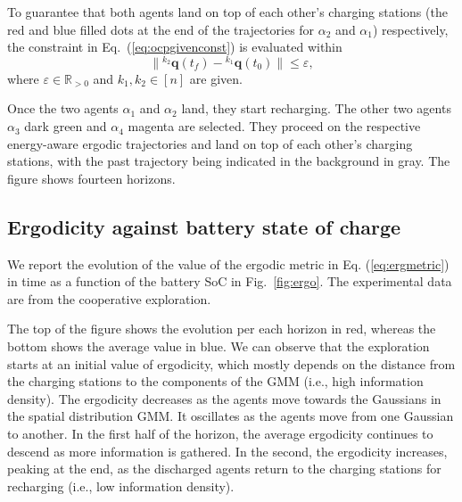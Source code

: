 \documentclass[letterpaper,10pt,conference,twoside]{IEEEtran}
\theoremstyle{definition}
\begin{document}
To guarantee that both agents land %
on top of each other's charging stations (the red and blue filled dots at the end of the trajectories for $\alpha_2$ and $\alpha_1$) respectively, %
the constraint in Eq.~(\ref{eq:ocpgivenconst}) is evaluated within
\begin{equation}\label{eq:resaddconst}
  \lVert{}^{k_2}\mathbf{q}(t_f)-{}^{k_1}\mathbf{q}(t_0)\rVert\leq\varepsilon,
\end{equation} 
where $\varepsilon\in\mathbb{R}_{>0}$ and $k_1,k_2\in[n]$ are given.

Once the two agents $\alpha_1$ and $\alpha_2$ land, they start recharging. %
The other two agents $\alpha_3$ dark green and $\alpha_4$ magenta are selected. %
They proceed on the respective energy-aware ergodic trajectories and land on top of each other's charging stations, with the past trajectory being indicated in the background in gray. The figure shows fourteen horizons. %

\subsection*{Ergodicity against battery state of charge}
\noindent
We report the evolution of the value of the ergodic metric in Eq. (\ref{eq:ergmetric}) in time as a function of the battery SoC in Fig.~\ref{fig:ergo}. The experimental data are from the cooperative exploration.%

The top of the figure shows the evolution per each horizon in red, whereas the bottom shows the average value in blue. We can observe that the exploration starts at an initial value of ergodicity, which mostly depends on the distance from the charging stations to the components of the GMM (i.e., high information density). The ergodicity decreases as the agents move towards the Gaussians in the spatial distribution GMM. It oscillates as the agents move from one Gaussian to another. In the first half of the horizon, the average ergodicity continues to descend as more information is gathered. In the second, the ergodicity increases, peaking at the end, as the discharged agents return to the charging stations for recharging (i.e., low information density).


\end{document}

